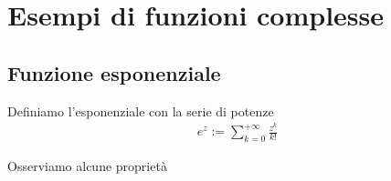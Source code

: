 
\chapter{Esempi di funzioni complesse}

\section{Funzione esponenziale}

\begin{definition}
	\label{defn:funzione-esponenziale}
	Definiamo l'esponenziale con la serie di potenze
	\begin{equation}
	\begin{aligned}
		e^z := \sum^{+\infty}_{k=0} \frac{z^k}{k!}
	\end{aligned}
	\end{equation}
\end{definition}

Osserviamo alcune proprietà 

